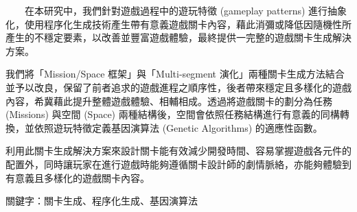 　　在本研究中，我們針對遊戲過程中的遊玩特徵 (gameplay patterns) 進行抽象化，使用程序化生成技術產生帶有意義遊戲關卡內容，藉此消彌或降低因隨機性所產生的不穩定要素，以改善並豐富遊戲體驗，最終提供一完整的遊戲關卡生成解決方案。

我們將「Mission/Space 框架」與「Multi-segment 演化」兩種關卡生成方法結合並予以改良，保留了前者追求的遊戲進程之順序性，後者帶來穩定且多樣化的遊戲內容，希冀藉此提升整體遊戲體驗、相輔相成。透過將遊戲關卡的劃分為任務 (Missions) 與空間 (Space) 兩種結構後，空間會依照任務結構進行有意義的同構轉換，並依照遊玩特徵定義基因演算法 (Genetic Algorithms) 的適應性函數。

利用此關卡生成解決方案來設計關卡能有效減少開發時間、容易掌握遊戲各元件的配置外，同時讓玩家在進行遊戲時能夠遵循關卡設計師的劇情脈絡，亦能夠體驗到有意義且多樣化的遊戲關卡內容。

關鍵字：關卡生成、程序化生成、基因演算法 